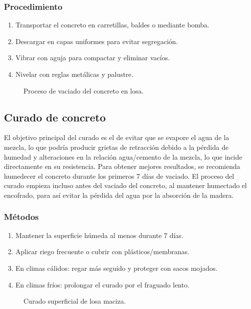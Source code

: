 \documentclass[12pt,a4paper]{article}
\begin{document}
	\subsubsection{Procedimiento}
	\begin{enumerate}
		\item Transportar el concreto en carretillas, baldes o mediante bomba.
		\item Descargar en capas uniformes para evitar segregación.
		\item Vibrar con aguja para compactar y eliminar vacíos.
		\item Nivelar con reglas metálicas y palustre.
	\end{enumerate}
	
	\begin{figure}[h]
		\centering
		\caption{Proceso de vaciado del concreto en losa.}
	\end{figure}
	
	\subsection{Curado de concreto}
	El objetivo principal del curado es el de evitar que se evapore el agua de la
	mezcla, lo que podría producir grietas de retracción debido a la pérdida de
	humedad y alteraciones en la relación agua/cemento de la mezcla, lo que incide
	directamente en su resistencia. Para obtener mejores resultados, se recomienda
	humedecer el concreto durante los primeros 7 días de vaciado.
	El proceso del curado empieza incluso antes del vaciado del concreto, al mantener
	humectado el encofrado, para así evitar la pérdida del agua por la absorción de la
	madera.
	
	\subsubsection{Métodos}
	\begin{enumerate}
		\item Mantener la superficie húmeda al menos durante 7 días.
		\item Aplicar riego frecuente o cubrir con plásticos/membranas.
		\item En climas cálidos: regar más seguido y proteger con sacos mojados.
		\item En climas fríos: prolongar el curado por el fraguado lento.
	\end{enumerate}
	
	\begin{figure}[h]
		\centering
		\caption{Curado superficial de losa maciza.}
	\end{figure}
	
\end{document}
